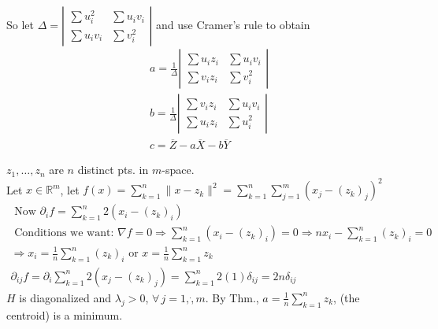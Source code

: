 \documentclass[twoside]{amsart}
\theoremstyle{plain}
\theoremstyle{definition}
\newcommand{\exercisehead}[1]
  {
   \noindent{\small\bf Exercise #1.}
   \smallskip}
\begin{document}
So let $\Delta = \left| \begin{matrix} \sum u_i^2 & \sum u_i v_i \\ \sum u_i v_i & \sum v_i^2 \end{matrix} \right|$ and use Cramer's rule to obtain
\[
\begin{aligned}
  & \boxed{ a = \frac{1}{ \Delta } \left| \begin{matrix} \sum u_i z_i & \sum u_i v_i \\ \sum v_i z_i & \sum v_i^2 \end{matrix} \right| } \\ 
  &  \boxed{ b = \frac{1}{\Delta } \left|  \begin{matrix} \sum v_i z_i & \sum u_i v_i \\ \sum u_i z_i & \sum u_i^2 \end{matrix} \right| } \\
  & \boxed{ c = \overline{Z} - a \overline{X} - b \overline{Y} }
\end{aligned}
\]

\exercisehead{23} $z_1, \dots, z_n$ are $n$ distinct pts. in $m$-space.  \\
Let $x\in \mathbb{R}^m$, let $f(x) = \sum_{k=1}^n \| x - z_k \|^2 = \sum_{k=1}^n \sum_{j=1}^m (x_j - (z_k)_j)^2$ 
\[
\begin{gathered}
  \text{ Now } \partial_i f = \sum_{k=1}^n 2 (x_i - (z_k)_i) \\ 
  \text{ Conditions we want: } \nabla f = 0 \Longrightarrow \sum_{k=1}^n (x_i - (z_k)_i) = 0 \Longrightarrow nx_i - \sum_{k=1}^n (z_k)_i =0 \\ 
  \Longrightarrow x_i = \frac{1}{n} \sum_{k=1}^n (z_k)_i \text{ or } x = \frac{1}{n} \sum_{k=1}^n z_k \\
  \partial_{ij} f = \partial_i \sum_{k=1}^n 2 (x_j - (z_k)_j) = \sum_{k=1}^n 2(1) \delta_{ij} = 2n \delta_{ij}
\end{gathered}
\]
$H$ is diagonalized and $\lambda_j > 0$, $\forall \, j = 1, \dot, m$.  By Thm., $a = \frac{1}{n} \sum_{k=1}^n z_k$, (the centroid) is a minimum.  
\end{document}
